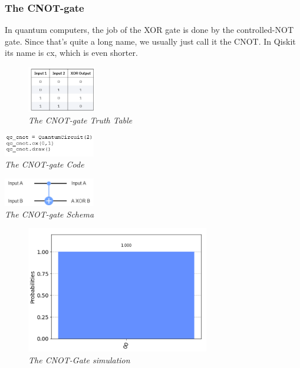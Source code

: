 \documentclass{article}
\begin{document}
\subsubsection{The CNOT-gate } 
In quantum computers, the job of the XOR gate is done by the controlled-NOT gate. Since that's quite a long name, we usually just call it the CNOT. In Qiskit its name is cx, which is even shorter.
\begin{figure}[h]
\begin{center}
\begin{minipage}[b]{3cm}
\centering
\includegraphics[width=3cm]{cnot_truthtable.png}\\\textit{The CNOT-gate Truth Table}
\end{minipage}
\end{center}
\end{figure}
\begin{mdframed}
\begin{center}
\begin{minipage}[b]{4cm}
\centering
\includegraphics[width=4cm]{cnot_code.png}\\\textit{The CNOT-gate Code}
\end{minipage}
\begin{minipage}[b]{4cm}
\centering
\includegraphics[width=4cm]{cnot_schema.png}\\\textit{The CNOT-gate Schema}
\end{minipage}
\end{center}
\end{mdframed}
\begin{figure}[h]
\begin{center}
\begin{minipage}[b]{8cm}
\centering
\includegraphics[width=8cm]{cnot_sym.png}\\\textit{The CNOT-Gate simulation}
\end{minipage}
\end{center}
\end{figure}
\newpage
\end{document}

